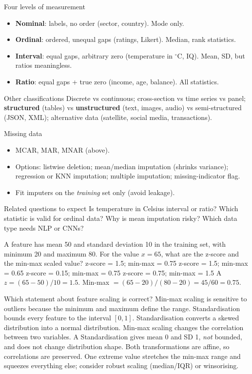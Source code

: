 {\begin{block}{Four levels of measurement}
		\begin{itemize}
			\item \textbf{Nominal}: labels, no order (sector, country). Mode only.
			\item \textbf{Ordinal}: ordered, unequal gaps (ratings, Likert). Median, rank statistics.
			\item \textbf{Interval}: equal gaps, arbitrary zero (temperature in $^\circ$C, IQ). Mean, SD, but ratios meaningless.
			\item \textbf{Ratio}: equal gaps + true zero (income, age, balance). All statistics.
	\end{itemize}\end{block}
	\begin{block}{Other classifications}
		Discrete vs continuous; cross-section vs time series vs panel; \textbf{structured} (tables) vs \textbf{unstructured} (text, images, audio) vs semi-structured (JSON, XML); alternative data (satellite, social media, transactions).
\end{block}}
{\begin{block}{Missing data}
		\begin{itemize}
			\item MCAR, MAR, MNAR (above).
			\item Options: listwise deletion; mean/median imputation (shrinks variance); regression or KNN imputation; multiple imputation; missing-indicator flag.
			\item Fit imputers on the \emph{training} set only (avoid leakage).
	\end{itemize}\end{block}
	\begin{alertblock}{Related questions to expect}
		Is temperature in Celsius interval or ratio? Which statistic is valid for ordinal data? Why is mean imputation risky? Which data type needs NLP or CNNs?
\end{alertblock}}

{A feature has mean 50 and standard deviation 10 in the training set, with minimum 20 and maximum 80. For the value $x=65$, what are the z-score and the min-max scaled value?}
{z-score = 1.5; min-max = 0.75}
{z-score = 1.5; min-max = 0.65}
{z-score = 0.15; min-max = 0.75}
{z-score = 0.75; min-max = 1.5}
{A}
{$z=(65-50)/10=1.5$. Min-max $=(65-20)/(80-20)=45/60=0.75$.}

{Which statement about feature scaling is correct?}
{Min-max scaling is sensitive to outliers because the minimum and maximum define the range.}
{Standardisation bounds every feature to the interval $[0,1]$.}
{Standardisation converts a skewed distribution into a normal distribution.}
{Min-max scaling changes the correlation between two variables.}
{A}
{Standardisation gives mean 0 and SD 1, \emph{not} bounded, and does not change distribution shape. Both transformations are affine, so correlations are preserved. One extreme value stretches the min-max range and squeezes everything else; consider robust scaling (median/IQR) or winsorising.}

